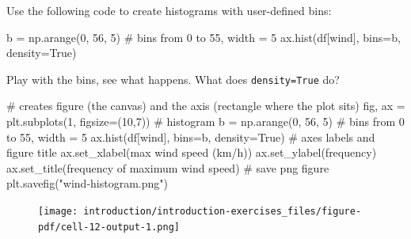 \documentclass[
  letterpaper,
  DIV=11,
  numbers=noendperiod]{scrreprt}
\newenvironment{Shaded}{\begin{snugshade}}{\end{snugshade}}
\newcommand{\CommentTok}[1]{\textcolor[rgb]{0.37,0.37,0.37}{#1}}
\newcommand{\DecValTok}[1]{\textcolor[rgb]{0.68,0.00,0.00}{#1}}
\newcommand{\NormalTok}[1]{\textcolor[rgb]{0.00,0.23,0.31}{#1}}
\newcommand{\OperatorTok}[1]{\textcolor[rgb]{0.37,0.37,0.37}{#1}}
\newcommand{\StringTok}[1]{\textcolor[rgb]{0.13,0.47,0.30}{#1}}
\newcommand{\VariableTok}[1]{\textcolor[rgb]{0.07,0.07,0.07}{#1}}
\begin{document}
Use the following code to create histograms with user-defined bins:

\begin{Shaded}
\begin{Highlighting}[]
\NormalTok{b }\OperatorTok{=}\NormalTok{ np.arange(}\DecValTok{0}\NormalTok{, }\DecValTok{56}\NormalTok{, }\DecValTok{5}\NormalTok{)  }\CommentTok{\# bins from 0 to 55, width = 5}
\NormalTok{ax.hist(df[}\StringTok{\textquotesingle{}wind\textquotesingle{}}\NormalTok{], bins}\OperatorTok{=}\NormalTok{b, density}\OperatorTok{=}\VariableTok{True}\NormalTok{)}
\end{Highlighting}
\end{Shaded}

Play with the bins, see what happens. What does \texttt{density=True}
do?

\begin{Shaded}
\begin{Highlighting}[]
\CommentTok{\# creates figure (the canvas) and the axis (rectangle where the plot sits)}
\NormalTok{fig, ax }\OperatorTok{=}\NormalTok{ plt.subplots(}\DecValTok{1}\NormalTok{, figsize}\OperatorTok{=}\NormalTok{(}\DecValTok{10}\NormalTok{,}\DecValTok{7}\NormalTok{))}
\CommentTok{\# histogram}
\NormalTok{b }\OperatorTok{=}\NormalTok{ np.arange(}\DecValTok{0}\NormalTok{, }\DecValTok{56}\NormalTok{, }\DecValTok{5}\NormalTok{)  }\CommentTok{\# bins from 0 to 55, width = 5}
\NormalTok{ax.hist(df[}\StringTok{\textquotesingle{}wind\textquotesingle{}}\NormalTok{], bins}\OperatorTok{=}\NormalTok{b, density}\OperatorTok{=}\VariableTok{True}\NormalTok{)}
\CommentTok{\# axes labels and figure title}
\NormalTok{ax.set\_xlabel(}\StringTok{\textquotesingle{}max wind speed (km/h)\textquotesingle{}}\NormalTok{)}
\NormalTok{ax.set\_ylabel(}\StringTok{\textquotesingle{}frequency\textquotesingle{}}\NormalTok{)}
\NormalTok{ax.set\_title(}\StringTok{\textquotesingle{}frequency of maximum wind speed\textquotesingle{}}\NormalTok{)}
\CommentTok{\# save png figure}
\NormalTok{plt.savefig(}\StringTok{"wind{-}histogram.png"}\NormalTok{)}
\end{Highlighting}
\end{Shaded}

\begin{figure}[H]

{\centering \texttt{[image: introduction/introduction-exercises\_files/figure-pdf/cell-12-output-1.png]}

}

\end{figure}
\end{document}

